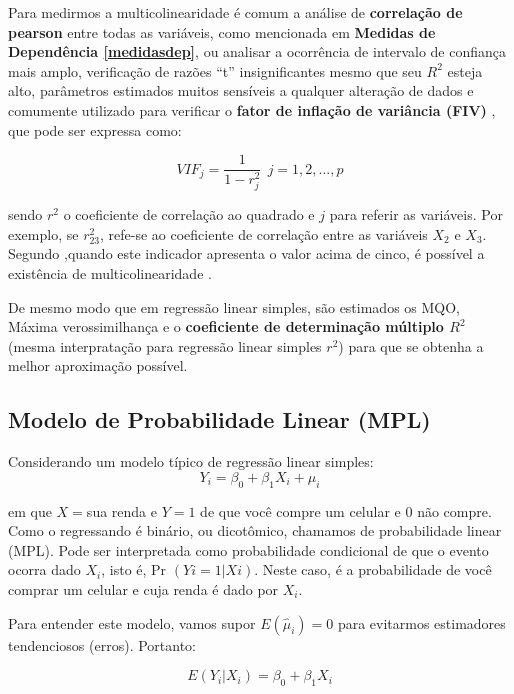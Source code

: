 \documentclass[
]{book}
\begin{document}
Para medirmos a multicolinearidade é comum a análise de \textbf{correlação de pearson} entre todas as variáveis, como mencionada em \textbf{Medidas de Dependência \ref{medidasdep}}, ou analisar a ocorrência de intervalo de confiança mais amplo, verificação de razões ``t'' insignificantes mesmo que seu \(R^2\) esteja alto, parâmetros estimados muitos sensíveis a qualquer alteração de dados e comumente utilizado para verificar o \textbf{fator de inflação de variância (FIV)} \citep{montgomery2012introduction}, que pode ser expressa como:

\begin{equation}
    VIF_j=\frac{1}{1-r^2_j} \ \ j=1,2,...,p
    \label{eq:vif}
\end{equation}

sendo \(r^2\) o coeficiente de correlação ao quadrado e \(j\) para referir as variáveis. Por exemplo, se \(r^2_{23}\), refe-se ao coeficiente de correlação entre as variáveis \(X_2\) e \(X_3\). Segundo ,quando este indicador apresenta o valor acima de cinco, é possível a existência de multicolinearidade \citep{maroco2014analise}.

De mesmo modo que em regressão linear simples, são estimados os MQO, Máxima verossimilhança e o \textbf{coeficiente de determinação múltiplo \(R^2\)} (mesma interpratação para regressão linear simples \(r^2\)) para que se obtenha a melhor aproximação possível.

\hypertarget{mpl}{%
\subsection{Modelo de Probabilidade Linear (MPL)}\label{mpl}}

Considerando um modelo típico de regressão linear simples:
\[Y_i=\beta_0+\beta_1 X_i+\mu_i \]

em que \(X =\)sua renda e \(Y=1\) de que você compre um celular e \(0\) não compre. Como o regressando é binário, ou dicotômico, chamamos de probabilidade linear (MPL). Pode ser interpretada como probabilidade condicional de que o evento ocorra dado \(X_i\), isto é, Pr \((Yi = 1 | Xi)\). Neste caso, é a probabilidade de você comprar um celular e cuja renda é dado por \(X_i\).

Para entender este modelo, vamos supor \(E(\hat{\mu}_i)=0\) para evitarmos estimadores tendenciosos (erros). Portanto:

\begin{equation}
    E(Y_i|X_i)=\beta_0+\beta_1 X_i
    \label{eq:regcond}
\end{equation}
\end{document}
